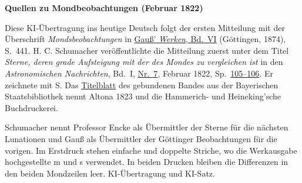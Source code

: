 \clearpage\thispagestyle{empty}
\begin{center}\textbf{Quellen zu Mondbeobachtungen (Februar 1822)}\end{center}
\noindent Diese KI-Übertragung ins heutige Deutsch folgt der ersten Mitteilung mit der Überschrift \textit{Mondsbeobachtungen} in \href{https://gdz.sub.uni-goettingen.de/id/PPN236007467}{Gauß’ \textit{Werken}, Bd.~VI} (Göttingen, 1874), S.~441. H. C. Schumacher veröffentlichte die Mitteilung zuerst unter dem Titel \textit{Sterne, deren grade Aufsteigung mit der des Mondes zu vergleichen ist} in den \textit{Astronomischen Nachrichten}, Bd.~I, \href{https://api.digitale-sammlungen.de/iiif/image/v2/bsb10049426_00061/full/1800,/0/default.jpg}{Nr.~7}, Februar 1822, Sp.~\href{https://api.digitale-sammlungen.de/iiif/image/v2/bsb10049426_00065/full/1800,/0/default.jpg}{105--106}. Er zeichnete mit S. Das \href{https://api.digitale-sammlungen.de/iiif/image/v2/bsb10049426_00005/full/1800,/0/default.jpg}{Titelblatt} des gebundenen Bandes aus der Bayerischen Staatsbibliothek nennt Altona 1823 und die Hammerich- und Heineking’sche Buchdruckerei.
\par\smallskip\noindent Schumacher nennt Professor Encke als Übermittler der Sterne für die nächsten Lunationen und Gauß als Übermittler der Göttinger Beobachtungen für die vorigen. Im Erstdruck stehen einfache und doppelte Striche, wo die Werkausgabe hochgestellte m und s verwendet. In beiden Drucken bleiben die Differenzen in den beiden Mondzeilen leer. KI-Übertragung und KI-Satz.
\clearpage
